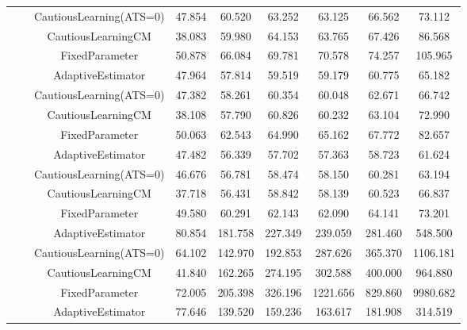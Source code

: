 \begin{table}[!h]
\begin{tabular}[t]{ccccccccc}
 &  & CautiousLearning(ATS=0) & 47.854 & 60.520 & 63.252 & 63.125 & 66.562 & 73.112\\

 &  & CautiousLearningCM & 38.083 & 59.980 & 64.153 & 63.765 & 67.426 & 86.568\\

 & \multirow[t]{-4}{*}{\centering\arraybackslash 1.00} & FixedParameter & 50.878 & 66.084 & 69.781 & 70.578 & 74.257 & 105.965\\
\cmidrule{2-9}
 &  & AdaptiveEstimator & 47.964 & 57.814 & 59.519 & 59.179 & 60.775 & 65.182\\

 &  & CautiousLearning(ATS=0) & 47.382 & 58.261 & 60.354 & 60.048 & 62.671 & 66.742\\

 &  & CautiousLearningCM & 38.108 & 57.790 & 60.826 & 60.232 & 63.104 & 72.990\\

 & \multirow[t]{-4}{*}{\centering\arraybackslash 1.25} & FixedParameter & 50.063 & 62.543 & 64.990 & 65.162 & 67.772 & 82.657\\
\cmidrule{2-9}
 &  & AdaptiveEstimator & 47.482 & 56.339 & 57.702 & 57.363 & 58.723 & 61.624\\

 &  & CautiousLearning(ATS=0) & 46.676 & 56.781 & 58.474 & 58.150 & 60.281 & 63.194\\

 &  & CautiousLearningCM & 37.718 & 56.431 & 58.842 & 58.139 & 60.523 & 66.837\\

\multirow[t]{-28}{*}{\centering\arraybackslash 50} & \multirow[t]{-4}{*}{\centering\arraybackslash 1.50} & FixedParameter & 49.580 & 60.291 & 62.143 & 62.090 & 64.141 & 73.201\\
\cmidrule{1-9}
 &  & AdaptiveEstimator & 80.854 & 181.758 & 227.349 & 239.059 & 281.460 & 548.500\\

 &  & CautiousLearning(ATS=0) & 64.102 & 142.970 & 192.853 & 287.626 & 365.370 & 1106.181\\

 &  & CautiousLearningCM & 41.840 & 162.265 & 274.195 & 302.588 & 400.000 & 964.880\\

 & \multirow[t]{-4}{*}{\centering\arraybackslash 0.25} & FixedParameter & 72.005 & 205.398 & 326.196 & 1221.656 & 829.860 & 9980.682\\
\cmidrule{2-9}
 &  & AdaptiveEstimator & 77.646 & 139.520 & 159.236 & 163.617 & 181.908 & 314.519\\


\end{tabular}
\end{table}
